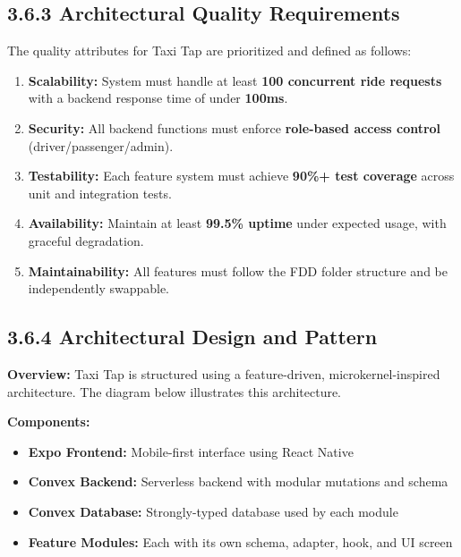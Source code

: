 \documentclass[12pt]{article}
\begin{document}
\subsection{3.6.3 Architectural Quality Requirements}
The quality attributes for Taxi Tap are prioritized and defined as follows:

\begin{enumerate}
  \item \textbf{Scalability:} System must handle at least \textbf{100 concurrent ride requests} with a backend response time of under \textbf{100ms}.
  \item \textbf{Security:} All backend functions must enforce \textbf{role-based access control} (driver/passenger/admin).
  \item \textbf{Testability:} Each feature system must achieve \textbf{90\%+ test coverage} across unit and integration tests.
  \item \textbf{Availability:} Maintain at least \textbf{99.5\% uptime} under expected usage, with graceful degradation.
  \item \textbf{Maintainability:} All features must follow the FDD folder structure and be independently swappable.
\end{enumerate}

\subsection{3.6.4 Architectural Design and Pattern}
\textbf{Overview:} Taxi Tap is structured using a feature-driven, microkernel-inspired architecture. The diagram below illustrates this architecture.

\vspace{1em}
\vspace{1em}

\textbf{Components:}

\begin{itemize}
  \item \textbf{Expo Frontend:} Mobile-first interface using React Native
  \item \textbf{Convex Backend:} Serverless backend with modular mutations and schema
  \item \textbf{Convex Database:} Strongly-typed database used by each module
  \item \textbf{Feature Modules:} Each with its own schema, adapter, hook, and UI screen
\end{itemize}
\end{document}
